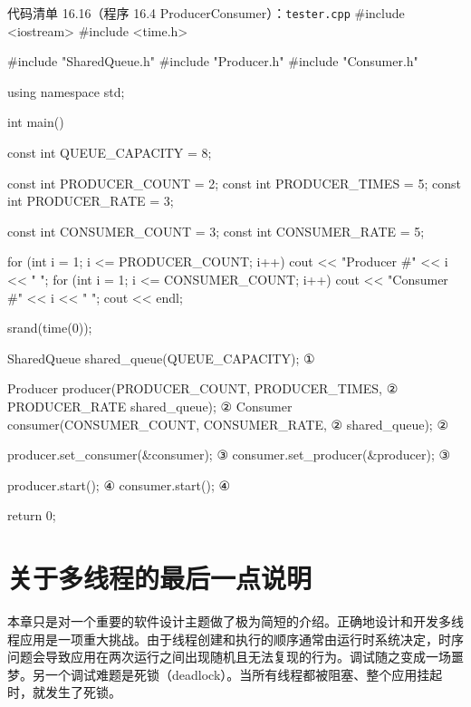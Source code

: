 \begin{codeboxt}{代码清单 16.16（程序 16.4 ProducerConsumer）：\texttt{tester.\allowbreak{}cpp}}
#include <iostream>
#include <time.h>

#include "SharedQueue.h"
#include "Producer.h"
#include "Consumer.h"

using namespace std;

int main()
{
    const int QUEUE_CAPACITY = 8;

    const int PRODUCER_COUNT = 2;
    const int PRODUCER_TIMES = 5;
    const int PRODUCER_RATE  = 3;

    const int CONSUMER_COUNT = 3;
    const int CONSUMER_RATE  = 5;

    for (int i = 1; i <= PRODUCER_COUNT; i++)
    {
        cout << "Producer #" << i << "   ";
    }
    for (int i = 1; i <= CONSUMER_COUNT; i++)
    {
        cout << "Consumer #" << i << "   ";
    }
    cout << endl;

    srand(time(0));

    SharedQueue shared_queue(QUEUE_CAPACITY);         ①

    Producer producer(PRODUCER_COUNT, PRODUCER_TIMES, ②
                      PRODUCER_RATE shared_queue);    ②
    Consumer consumer(CONSUMER_COUNT, CONSUMER_RATE,  ②
                      shared_queue);                  ②

    producer.set_consumer(&consumer);                 ③
    consumer.set_producer(&producer);                 ③

    producer.start();                                 ④
    consumer.start();                                 ④

    return 0;
}
\end{codeboxt}
\par
{}\par
{}\par
{}\par

\section{关于多线程的最后一点说明}

本章只是对一个重要的软件设计主题做了极为简短的介绍。正确地设计和开发多线程应用是一项重大挑战。由于线程创建和执行的顺序通常由运行时系统决定，时序问题会导致应用在两次运行之间出现随机且无法复现的行为。调试随之变成一场噩梦。另一个调试难题是死锁（deadlock）。当所有线程都被阻塞、整个应用挂起时，就发生了死锁。


